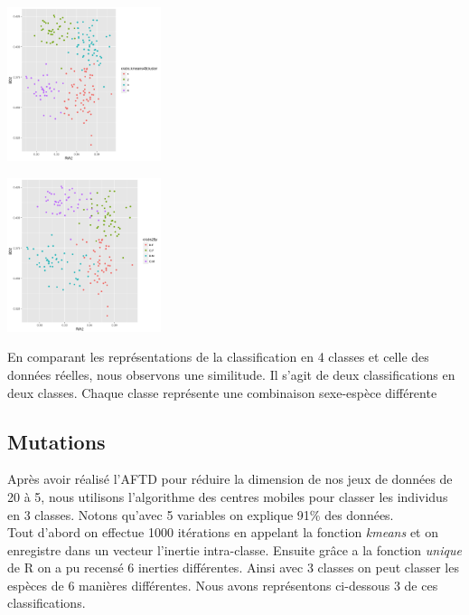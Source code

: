 \documentclass[10pt]{article}
\begin{document}
\begin{center}
	\includegraphics[width=45mm]{Figures/Crabs2_2/kmeans4.png}
	\label{fig:iris_kmeans4}
\end{center}
\begin{center}
	\includegraphics[width=45mm]{Figures/Crabs2_2/plotRealData.png}
	\label{fig:iris_kmeansReal}
\end{center}
En comparant les représentations de la classification en 4 classes et celle des données réelles, nous observons une similitude. Il s'agit de deux classifications en deux classes. Chaque classe représente une combinaison sexe-espèce différente 

\subsection{Mutations}
Après avoir réalisé l'AFTD pour réduire la dimension de nos jeux de données de 20 à 5, nous utilisons l'algorithme des centres mobiles pour classer les individus en 3 classes. Notons qu'avec 5 variables on explique 91\% des données.\\
Tout d'abord on effectue 1000 itérations en appelant la fonction \textit{kmeans} et on enregistre dans un vecteur l'inertie  intra-classe. Ensuite grâce a la fonction \textit{unique} de R on a pu recensé  6 inerties différentes. Ainsi avec 3 classes on peut classer les espèces de 6 manières différentes. Nous avons représentons ci-dessous 3 de ces classifications.\\
\end{document}
